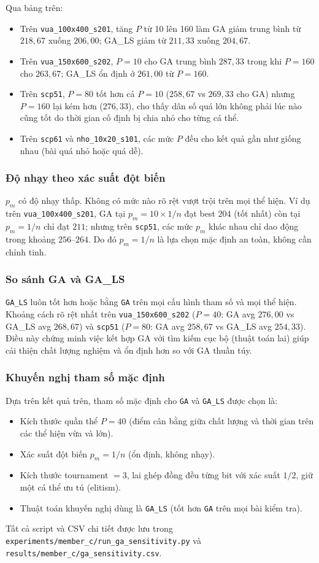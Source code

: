 Qua bảng trên:
\begin{itemize}
 \item Trên \texttt{vua\_100x400\_s201}, tăng $P$ từ 10 lên 160 làm GA giảm trung bình từ $218{,}67$ xuống $206{,}00$; GA\_LS giảm từ $211{,}33$ xuống $204{,}67$.
 \item Trên \texttt{vua\_150x600\_s202}, $P=10$ cho GA trung bình $287{,}33$ trong khi $P=160$ cho $263{,}67$; GA\_LS ổn định ở $261{,}00$ từ $P=160$.
 \item Trên \texttt{scp51}, $P=80$ tốt hơn cả $P=10$ ($258{,}67$ vs $269{,}33$ cho GA) nhưng $P=160$ lại kém hơn ($276{,}33$), cho thấy dân số quá lớn không phải lúc nào cũng tốt do thời gian cố định bị chia nhỏ cho từng cá thể.
 \item Trên \texttt{scp61} và \texttt{nho\_10x20\_s101}, các mức $P$ đều cho kết quả gần như giống nhau (bài quá nhỏ hoặc quá dễ).
\end{itemize}

\subsubsection{Độ nhạy theo xác suất đột biến}

$p_m$ có độ nhạy thấp. Không có mức nào rõ rệt vượt trội trên mọi thể hiện. Ví dụ trên \texttt{vua\_100x400\_s201}, GA tại $p_m=10\times1/n$ đạt best $204$ (tốt nhất) còn tại $p_m=1/n$ chỉ đạt $211$; nhưng trên \texttt{scp51}, các mức $p_m$ khác nhau chỉ dao động trong khoảng $256$--$264$. Do đó $p_m=1/n$ là lựa chọn mặc định an toàn, không cần chỉnh tinh.

\subsubsection{So sánh GA và GA\_LS}

\texttt{GA\_LS} luôn tốt hơn hoặc bằng \texttt{GA} trên mọi cấu hình tham số và mọi thể hiện. Khoảng cách rõ rệt nhất trên \texttt{vua\_150x600\_s202} ($P=40$: GA avg $276{,}00$ vs GA\_LS avg $268{,}67$) và \texttt{scp51} ($P=80$: GA avg $258{,}67$ vs GA\_LS avg $254{,}33$). Điều này chứng minh việc kết hợp GA với tìm kiếm cục bộ (thuật toán lai) giúp cải thiện chất lượng nghiệm và ổn định hơn so với GA thuần túy.

\subsubsection{Khuyến nghị tham số mặc định}

Dựa trên kết quả trên, tham số mặc định cho \texttt{GA} và \texttt{GA\_LS} được chọn là:
\begin{itemize}
 \item Kích thước quần thể $P = 40$ (điểm cân bằng giữa chất lượng và thời gian trên các thể hiện vừa và lớn).
 \item Xác suất đột biến $p_m = 1/n$ (ổn định, không nhạy).
 \item Kích thước tournament $= 3$, lai ghép đồng đều từng bit với xác suất $1/2$, giữ một cá thể ưu tú (elitism).
 \item Thuật toán khuyến nghị dùng là \texttt{GA\_LS} (tốt hơn \texttt{GA} trên mọi bài kiểm tra).
\end{itemize}

Tất cả script và CSV chi tiết được lưu trong \texttt{experiments/member\_c/run\_ga\_sensitivity.py} và \texttt{results/member\_c/ga\_sensitivity.csv}.
